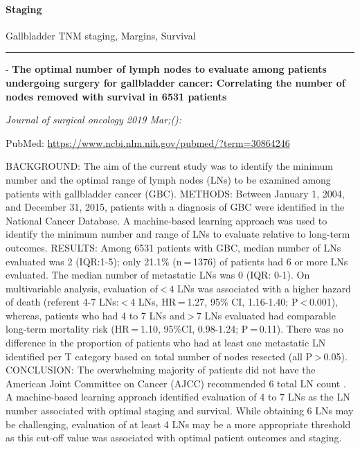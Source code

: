 \documentclass[]{article}
\let\oldparagraph\paragraph
\renewcommand{\paragraph}[1]{\oldparagraph{#1}\mbox{}}
\begin{document}
\hypertarget{staging-1}{%
\paragraph{Staging}\label{staging-1}}

Gallbladder TNM staging, Margins, Survival

\begin{center}\rule{0.5\linewidth}{\linethickness}\end{center}

 - \textbf{The optimal number of lymph nodes to evaluate among patients
undergoing surgery for gallbladder cancer: Correlating the number of
nodes removed with survival in 6531 patients}

\emph{Journal of surgical oncology 2019 Mar;():}

PubMed: \url{https://www.ncbi.nlm.nih.gov/pubmed/?term=30864246}

BACKGROUND: The aim of the current study was to identify the minimum
number and the optimal range of lymph nodes (LNs) to be examined among
patients with gallbladder cancer (GBC). METHODS: Between January 1,
2004, and December 31, 2015, patients with a diagnosis of GBC were
identified in the National Cancer Database. A machine-based learning
approach was used to identify the minimum number and range of LNs to
evaluate relative to long-term outcomes. RESULTS: Among 6531 patients
with GBC, median number of LNs evaluated was 2 (IQR:1-5); only 21.1\%
(n = 1376) of patients had 6 or more LNs evaluated. The median number of
metastatic LNs was 0 (IQR: 0-1). On multivariable analysis, evaluation
of \textless{} 4 LNs was associated with a higher hazard of death
(referent 4-7 LNs: \textless{} 4 LNs, HR = 1.27, 95\% CI, 1.16-1.40;
P \textless{} 0.001), whereas, patients who had 4 to 7 LNs
and \textgreater{} 7 LNs evaluated had comparable long-term mortality
risk (HR = 1.10, 95\%CI, 0.98-1.24; P = 0.11). There was no difference
in the proportion of patients who had at least one metastatic LN
identified per T category based on total number of nodes resected (all
P \textgreater{} 0.05). CONCLUSION: The overwhelming majority of
patients did not have the American Joint Committee on Cancer (AJCC)
recommended 6 total LN count . A machine-based learning approach
identified evaluation of 4 to 7 LNs as the LN number associated with
optimal staging and survival. While obtaining 6 LNs may be challenging,
evaluation of at least 4 LNs may be a more appropriate threshold as this
cut-off value was associated with optimal patient outcomes and staging.
\end{document}
